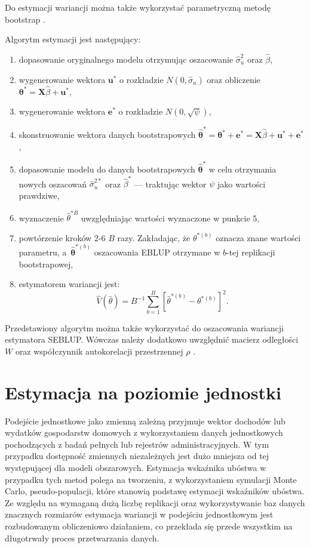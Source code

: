 Do estymacji wariancji można także wykorzystać parametryczną metodę bootstrap \citep{gonzales2008}.

Algorytm estymacji jest następujący:

\begin{enumerate}
\item dopasowanie oryginalnego modelu otrzymując oszacowanie $\hat{\sigma}_u^2$ oraz $\hat{\beta}$,
\item wygenerowanie wektora $\mathbf{u^*}$ o rozkładzie $N(0, \hat{\sigma}_u)$ oraz obliczenie $\mathbf{\theta^*}=\mathbf{X}\hat{\beta}+\mathbf{u^*}$,
\item wygenerowanie wektora $\mathbf{e^*}$ o rozkładzie $N(0, \sqrt{\psi})$,
\item skonstruowanie wektora danych bootstrapowych $\mathbf{\hat{\theta}^*}=\mathbf{\theta^*}+\mathbf{e^*}=\mathbf{X}\hat{\beta}+\mathbf{u^*}+\mathbf{e^*}$,
\item dopasowanie modelu do danych bootstrapowych $\mathbf{\hat{\theta}^*}$ w celu otrzymania nowych oszacowań $\hat{\sigma}_u^{2*}$ oraz $\hat{\beta}^{*}$ --- traktując wektor $\psi$ jako wartości prawdziwe,
\item wyznaczenie $\hat{\theta}^{*B}$ uwzględniając wartości wyznaczone w punkcie 5,
\item powtórzenie kroków 2-6 $B$ razy. Zakładając, że $\theta^{*(b)}$ oznacza znane wartości parametru, a~$\mathbf{\hat{\theta}}^{*(b)}$ oszacowania EBLUP otrzymane w $b$-tej replikacji bootstrapowej,
\item estymatorem wariancji jest: 
\begin{equation}
\hat{V}(\hat{\theta})=B^{-1}\sum\limits_{b=1}^{B}{[\hat{\theta}^{*(b)}-\theta^{*(b)}]^2}.\end{equation}
\end{enumerate}

Przedstawiony algorytm można także wykorzystać do oszacowania wariancji estymatora SEBLUP. Wówczas należy dodatkowo uwzględnić macierz odległości $W$ oraz współczynnik autokorelacji przestrzennej $\rho$ \citep{pratesi2007}.

\section{Estymacja na poziomie jednostki}

Podejście jednostkowe jako zmienną zależną przyjmuje wektor dochodów lub wydatków gospodarstw domowych z wykorzystaniem danych jednostkowych pochodzących z badań pełnych lub rejestrów administracyjnych. W tym przypadku dostępność zmiennych niezależnych jest dużo mniejsza od tej występującej dla modeli obszarowych. Estymacja wskaźnika ubóstwa w przypadku tych metod polega na tworzeniu, z wykorzystaniem symulacji Monte Carlo, pseudo-populacji, które stanowią podstawę estymacji wskaźników ubóstwa. Ze względu na wymaganą dużą liczbę replikacji oraz wykorzystywanie baz danych znacznych rozmiarów estymacja wariancji w podejściu jednostkowym jest rozbudowanym obliczeniowo działaniem, co przekłada się przede wszystkim na długotrwały proces przetwarzania danych.

